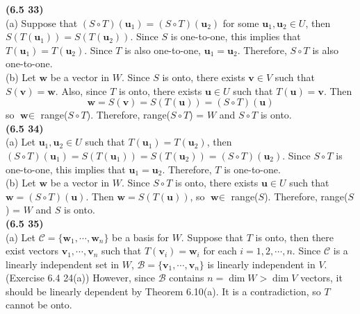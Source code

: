 \textbf{(6.5 33)} \\
(a) Suppose that $(S \circ T)(\textbf{u}_1) = (S \circ T)(\textbf{u}_2)$ for some $\textbf{u}_1, \textbf{u}_2 \in U$, then $S(T(\textbf{u}_1)) = S(T(\textbf{u}_2))$. Since $S$ is one-to-one, this implies that $T(\textbf{u}_1) = T(\textbf{u}_2)$. Since $T$ is also one-to-one, $\textbf{u}_1 = \textbf{u}_2$. Therefore, $S \circ T$ is also one-to-one. \\

(b) Let $\textbf{w}$ be a vector in $W$. Since $S$ is onto, there exists $\textbf{v} \in V$ such that $S(\textbf{v}) = \textbf{w}$. Also, since $T$ is onto, there exists $\textbf{u} \in U$ such that $T(\textbf{u}) = \textbf{v}$. Then \begin{equation*}
\textbf{w} = S(\textbf{v}) = S(T(\textbf{u})) = (S \circ T)(\textbf{u})
\end{equation*} so $\textbf{w} \in $ range($S \circ T$). Therefore, range($S \circ T$) = $W$ and $S \circ T$ is onto. \\


\textbf{(6.5 34)} \\
(a) Let $\textbf{u}_1, \textbf{u}_2 \in U$ such that $T(\textbf{u}_1) = T(\textbf{u}_2)$, then $(S \circ T)(\textbf{u}_1) = S(T(\textbf{u}_1)) = S(T(\textbf{u}_2)) = (S \circ T)(\textbf{u}_2)$. Since $S \circ T$ is one-to-one, this implies that $\textbf{u}_1 = \textbf{u}_2$. Therefore, $T$ is one-to-one. \\

(b) Let $\textbf{w}$ be a vector in $W$. Since $S \circ T$ is onto, there exists $\textbf{u} \in U$ such that $\textbf{w} = (S \circ T)(\textbf{u})$. Then $\textbf{w} = S(T(\textbf{u}))$, so $\textbf{w} \in$ range($S$). Therefore, range($S$) = $W$ and $S$ is onto. \\

\textbf{(6.5 35)} \\
(a) Let $\mathcal{C} = \{\textbf{w}_1, \cdots, \textbf{w}_n\}$ be a basis for $W$. Suppose that $T$ is onto, then there exist vectors $\textbf{v}_1, \cdots, \textbf{v}_n$ such that $T(\textbf{v}_i) = \textbf{w}_i$ for each $i = 1, 2, \cdots, n$. Since $\mathcal{C}$ is a linearly independent set in $W$, $\mathcal{B} = \{\textbf{v}_1, \cdots, \textbf{v}_n\}$ is linearly independent in $V$. (Exercise 6.4 24(a)) However, since $\mathcal{B}$ contains $n =\dim W > \dim V$ vectors, it should be linearly dependent by Theorem 6.10(a). It is a contradiction, so $T$ cannot be onto. \\

